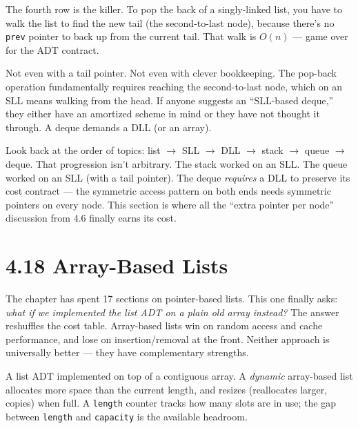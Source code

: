 \documentclass[11pt]{article}
\begin{document}
The fourth row is the killer. To pop the back of a singly-linked
list, you have to walk the list to find the new tail (the
second-to-last node), because there's no \texttt{prev} pointer to
back up from the current tail. That walk is $O(n)$ --- game over
for the ADT contract.

\begin{warnbox}
Not even with a tail pointer. Not even with clever bookkeeping.
The pop-back operation fundamentally requires reaching the
second-to-last node, which on an SLL means walking from the head.
If anyone suggests an ``SLL-based deque,'' they either have an
amortized scheme in mind or they have not thought it through. A
deque demands a DLL (or an array).
\end{warnbox}

\begin{ideabox}
Look back at the order of topics: list $\to$ SLL $\to$ DLL $\to$
stack $\to$ queue $\to$ deque. That progression isn't arbitrary.
The stack worked on an SLL. The queue worked on an SLL (with a
tail pointer). The deque \emph{requires} a DLL to preserve its
cost contract --- the symmetric access pattern on both ends needs
symmetric pointers on every node. This section is where all the
``extra pointer per node'' discussion from 4.6 finally earns its
cost.
\end{ideabox}

\section{4.18 Array-Based Lists}

The chapter has spent 17 sections on pointer-based lists. This
one finally asks: \emph{what if we implemented the list ADT on a
plain old array instead?} The answer reshuffles the cost table.
Array-based lists win on random access and cache performance, and
lose on insertion/removal at the front. Neither approach is
universally better --- they have complementary strengths.

\begin{defnbox}
A list ADT implemented on top of a contiguous array. A
\emph{dynamic} array-based list allocates more space than the
current length, and resizes (reallocates larger, copies) when
full. A \texttt{length} counter tracks how many slots are in use;
the gap between \texttt{length} and \texttt{capacity} is the
available headroom.
\end{defnbox}
\end{document}
